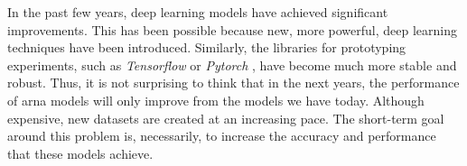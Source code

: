 

In the past few years, deep learning models have achieved
significant improvements. This has been possible because
new, more powerful, deep learning techniques have been
introduced. Similarly, the libraries for prototyping
experiments, such as \emph{Tensorflow}
\parencite{abadi2016tensorflow} or \emph{Pytorch}
\parencite{paszke2019pytorch}, have become much more stable
and robust. Thus, it is not surprising to think that in the
next years, the performance of \gls{arna} models will only
improve from the models we have today. Although expensive,
new datasets are created at an increasing pace. The
short-term goal around this problem is, necessarily, to
increase the accuracy and performance that these models
achieve.
